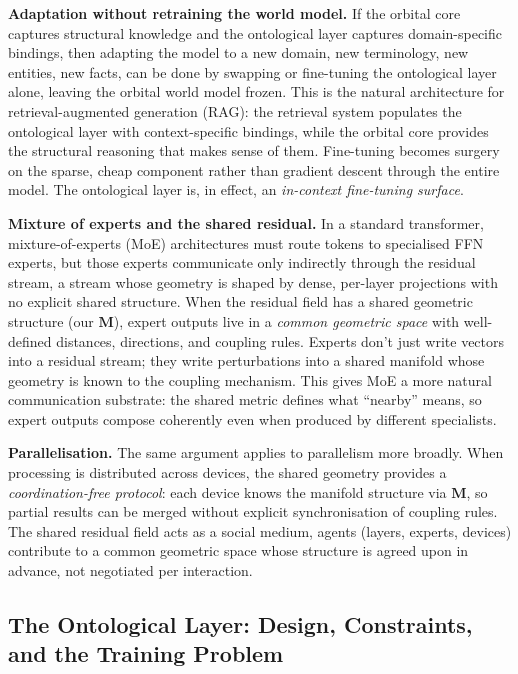 \documentclass[11pt, a4paper]{article}
\newcommand{\M}{\mathbf{M}}
\theoremstyle{remark}
\begin{document}
\textbf{Adaptation without retraining the world model.}
If the orbital core captures structural knowledge and the ontological layer captures domain-specific bindings, then adapting the model to a new domain, new terminology, new entities, new facts, can be done by swapping or fine-tuning the ontological layer alone, leaving the orbital world model frozen.
This is the natural architecture for retrieval-augmented generation (RAG): the retrieval system populates the ontological layer with context-specific bindings, while the orbital core provides the structural reasoning that makes sense of them.
Fine-tuning becomes surgery on the sparse, cheap component rather than gradient descent through the entire model.
The ontological layer is, in effect, an \emph{in-context fine-tuning surface}.

\textbf{Mixture of experts and the shared residual.}
In a standard transformer, mixture-of-experts (MoE) architectures must route tokens to specialised FFN experts, but those experts communicate only indirectly through the residual stream, a stream whose geometry is shaped by dense, per-layer projections with no explicit shared structure.
When the residual field has a shared geometric structure (our $\M$), expert outputs live in a \emph{common geometric space} with well-defined distances, directions, and coupling rules.
Experts don't just write vectors into a residual stream; they write perturbations into a shared manifold whose geometry is known to the coupling mechanism.
This gives MoE a more natural communication substrate: the shared metric defines what ``nearby'' means, so expert outputs compose coherently even when produced by different specialists.

\textbf{Parallelisation.}
The same argument applies to parallelism more broadly.
When processing is distributed across devices, the shared geometry provides a \emph{coordination-free protocol}: each device knows the manifold structure via $\M$, so partial results can be merged without explicit synchronisation of coupling rules.
The shared residual field acts as a social medium, agents (layers, experts, devices) contribute to a common geometric space whose structure is agreed upon in advance, not negotiated per interaction.

\subsection{The Ontological Layer: Design, Constraints, and the Training Problem}
\label{sec:onto-design}
\end{document}
